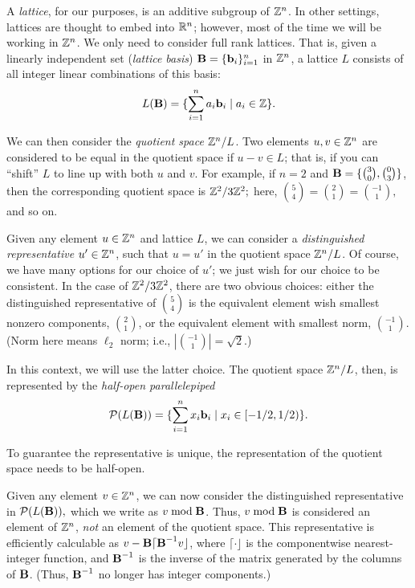 A \emph{lattice}, for our purposes, is an additive subgroup of $\mathbb{Z}^n$. In other settings, lattices are thought to embed into $\mathbb{R}^n$; however, most of the time we will be working in $\mathbb{Z}^n$. We only need to consider full rank lattices. That is, given a linearly independent set (\emph{lattice basis}) ${\textbf B} = \{{\textbf b}_i\}_{i = 1}^n$ in $\mathbb{Z}^n$, a lattice $L$ consists of all integer linear combinations of this basis:
\[L(\textbf B) = \{\sum_{i = 1}^n a_i {\textbf b}_i \mid a_i \in \mathbb{Z}\}.\]

We can then consider the \emph{quotient space} $\mathbb{Z}^n / L$. Two elements $u, v \in \mathbb{Z}^n$ are considered to be equal in the quotient space if $u - v \in L$; that is, if you can ``shift'' $L$ to line up with both $u$ and $v$. For example, if $n = 2$ and ${\textbf B} = \{\binom{3}{0}, \binom{0}{3}\}$, then the corresponding quotient space is $\mathbb{Z}^2 / 3\mathbb{Z}^2;$ here, $\binom{5}{4} = \binom{2}{1} = \binom{-1}{1},$ and so on.

Given any element $u \in \mathbb{Z}^n$ and lattice $L$, we can consider a \emph{distinguished representative} $u' \in \mathbb{Z}^n$, such that $u = u'$ in the quotient space $\mathbb{Z}^n / L$. Of course, we have many options for our choice of $u'$; we just wish for our choice to be consistent. In the case of $\mathbb{Z}^2 / 3\mathbb{Z}^2$, there are two obvious choices: either the distinguished representative of $\binom{5}{4}$ is the equivalent element wish smallest nonzero components, $\binom{2}{1}$, or the equivalent element with smallest norm, $\binom{-1}{1}$. (Norm here means $\ell_2$ norm; i.e., $|\binom{-1}{1}| = \sqrt{2}.$)

In this context, we will use the latter choice. The quotient space $\mathbb{Z}^n / L$, then, is represented by the \emph{half-open parallelepiped}
\[\mathcal{P}(L(\textbf B)) = \{\sum_{i=1}^n x_i {\textbf b}_i \mid x_i \in [-1/2, 1/2)\}.\]

To guarantee the representative is unique, the representation of the quotient space needs to be half-open.

Given any element $v \in \mathbb{Z}^n$, we can now consider the distinguished representative in $\mathcal{P}(L(\textbf B)),$ which we write as $v \bmod \textbf B$. Thus, $v \bmod \textbf B$ is considered an element of $\mathbb{Z}^n$, \emph{not} an element of the quotient space. This representative is efficiently calculable as $v - \textbf{B} \lceil \textbf{B}^{-1} v \rfloor$, where $\lceil \cdot \rfloor$ is the componentwise nearest-integer function, and $\textbf{B}^{-1}$ is the inverse of the matrix generated by the columns of $\textbf{B}$. (Thus, $\textbf{B}^{-1}$ no longer has integer components.)

